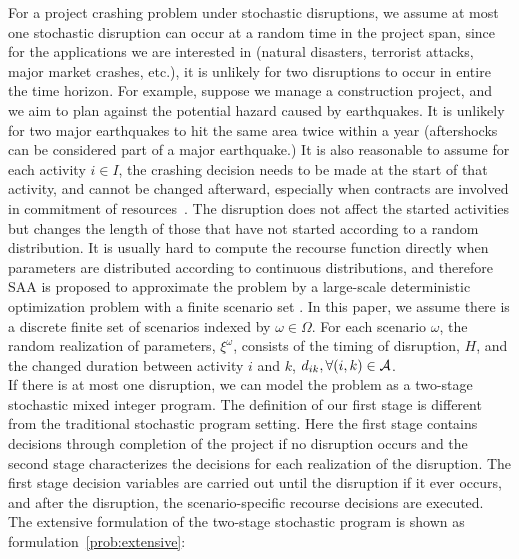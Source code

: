 \documentclass[11pt]{article}
\newcommand{\cA}{{\cal A}}
\begin{document}
	For a project crashing problem under stochastic disruptions, we assume at most one stochastic disruption can occur at a random time in the project span, since for the applications we are interested in (natural disasters, terrorist attacks, major market crashes, etc.), it is unlikely for two disruptions to occur in entire the time horizon. For example, suppose we manage a construction project, and we aim to plan against the potential hazard caused by earthquakes. It is unlikely for two major earthquakes to hit the same area twice within a year (aftershocks can be considered part of a major earthquake.) It is also reasonable to assume for each activity \(i \in I\), the crashing decision needs to be made at the start of that activity, and cannot be changed afterward, especially when contracts are involved in commitment of resources~\cite{oberlender1993project}. The disruption does not affect the started activities but changes the length of those that have not started according to a random distribution. It is usually hard to compute the recourse function directly when parameters are distributed according to continuous distributions, and therefore SAA is proposed to approximate the problem by a large-scale deterministic optimization problem with a finite scenario set \cite{kim2015guide,shapiro2009lectures}. In this paper, we assume there is a discrete finite set of scenarios indexed by \(\omega \in \Omega\). For each scenario \(\omega\), the random realization of parameters, \(\xi^\omega\), consists of the timing of disruption, \(H\), and the changed duration between activity \(i\) and \(k\), \(d_{ik}, \forall (i,k) \in \cA\). \\
	\newline
	If there is at most one disruption, we can model the problem as a two-stage stochastic mixed integer program. The definition of our first stage is different from the traditional stochastic program setting. Here the first stage contains decisions through completion of the project if no disruption occurs and the second stage characterizes the decisions for each realization of the disruption. The first stage decision variables are carried out until the disruption if it ever occurs, and after the disruption, the scenario-specific recourse decisions are executed.\\
	\newline
	The extensive formulation of the two-stage stochastic program is shown as formulation~\eqref{prob:extensive}:
\end{document}
